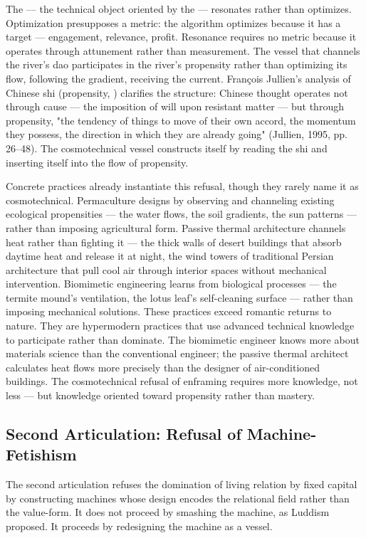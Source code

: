 The    — the technical object oriented by the  — resonates rather than optimizes. Optimization presupposes a metric: the algorithm optimizes because it has a target — engagement, relevance, profit. Resonance requires no metric because it operates through attunement rather than measurement. The vessel that channels the river's dao participates in the river's propensity rather than optimizing its flow, following the gradient, receiving the current. François Jullien's analysis of Chinese shi (propensity,  ) clarifies the structure: Chinese thought operates not through cause — the imposition of will upon resistant matter — but through propensity, "the tendency of things to move of their own accord, the momentum they possess, the direction in which they are already going" (Jullien, 1995, pp. 26–48). The cosmotechnical vessel constructs itself by reading the shi and inserting itself into the flow of propensity.

Concrete practices already instantiate this refusal, though they rarely name it as cosmotechnical. Permaculture designs by observing and channeling existing ecological propensities — the water flows, the soil gradients, the sun patterns — rather than imposing agricultural form. Passive thermal architecture channels heat rather than fighting it — the thick walls of desert buildings that absorb daytime heat and release it at night, the wind towers of traditional Persian architecture that pull cool air through interior spaces without mechanical intervention. Biomimetic engineering learns from biological processes — the termite mound's ventilation, the lotus leaf's self-cleaning surface — rather than imposing mechanical solutions. These practices exceed romantic returns to nature. They are hypermodern practices that use advanced technical knowledge to participate rather than dominate. The biomimetic engineer knows more about materials science than the conventional engineer; the passive thermal architect calculates heat flows more precisely than the designer of air-conditioned buildings. The cosmotechnical refusal of enframing requires more knowledge, not less — but knowledge oriented toward propensity rather than mastery.

\subsection{Second Articulation: Refusal of Machine-Fetishism}

The second articulation refuses the domination of living relation by fixed capital by constructing machines whose design encodes the relational field rather than the value-form. It does not proceed by smashing the machine, as Luddism proposed. It proceeds by redesigning the machine as a vessel.

